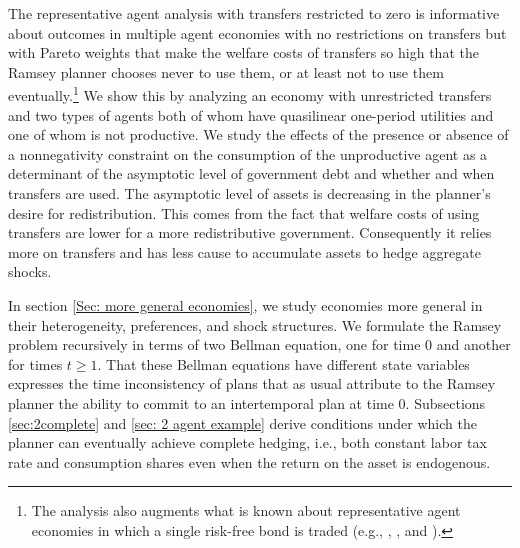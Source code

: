 \documentclass[thmsb,11pt]{article}
\begin{document}
 The representative agent analysis with transfers restricted to zero
  is   informative about outcomes in multiple agent economies with no restrictions on transfers but with Pareto weights that make
     the welfare  costs of transfers so  high that the Ramsey planner chooses never to use them, or at least not to use them
     eventually.\footnote{The analysis
also  augments what is known about representative agent economies in which a single  risk-free bond is traded (e.g., \citet{Aiyagari2002}, \citet{Farhi2010},
and \citet{Faraglia2011}).}
We show this by analyzing an economy with  unrestricted transfers and two types of agents both of whom
 have quasilinear one-period utilities and one of whom is not productive. We study the effects of the presence or absence of  a nonnegativity constraint on the consumption of the unproductive agent as a determinant of the asymptotic level of government debt and  whether and when transfers are used.
The asymptotic level of assets is decreasing in the planner's desire for redistribution.
This comes from the fact that welfare costs of using transfers are lower for a more redistributive government.
Consequently it relies more on transfers and has less cause to accumulate assets to hedge aggregate shocks.



%
%
%

 In section \ref{Sec: more general economies},
we study economies  more general in  their  heterogeneity, preferences, and shock structures.  We formulate the Ramsey problem recursively in terms of two Bellman equation,
one for time $0$ and another for times $t\geq 1$.  That these Bellman equations have different state variables expresses the time inconsistency
of  plans that  as usual attribute to the  Ramsey planner the ability to commit to an intertemporal plan at time $0$.
Subsections \ref{sec:2complete} and \ref{sec: 2 agent example}   derive conditions under which the planner can eventually
achieve complete hedging, i.e., both constant labor tax rate and consumption shares even when the return on the asset is endogenous.

\end{document}
